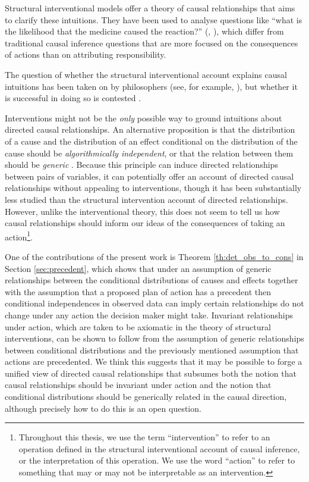 Structural interventional models offer a theory of causal relationships that aims to clarify these intuitions. They have been used to analyse questions like ``what is the likelihood that the medicine caused the reaction?'' (\citet[ch. ~9]{pearl_causality:_2009}, \citet{pearl_causes_2015}), which differ from traditional causal inference questions that are more focused on the consequences of actions than on attributing responsibility. 

The question of whether the structural interventional account explains causal intuitions has been taken on by philosophers (see, for example, \citet{woodward_causation_2016}), but whether it is successful in doing so is contested \citep{cartwright_modularity_2001}.

Interventions might not be the \emph{only} possible way to ground intuitions about directed causal relationships. An alternative proposition is that the distribution of a cause and the distribution of an effect conditional on the distribution of the cause should be \emph{algorithmically independent}, or that the relation between them should be \emph{generic} \citep{lemeire_replacing_2013}. Because this principle can induce directed relationships between pairs of variables, it can potentially offer an account of directed causal relationships without appealing to interventions, though it has been substantially less studied than the structural intervention account of directed relationships. However, unlike the interventional theory, this does not seem to tell us how causal relationships should inform our ideas of the consequences of taking an action\footnote{Throughout this thesis, we use the term ``intervention'' to refer to an operation defined in the structural interventional account of causal inference, or the interpretation of this operation. We use the word ``action'' to refer to something that may or may not be interpretable as an intervention.}.

One of the contributions of the present work is Theorem \ref{th:det_obs_to_cons} in Section \ref{sec:precedent}, which shows that under an assumption of generic relationships between the conditional distributions of causes and effects together with the assumption that a proposed plan of action has a precedent then conditional independences in observed data can imply certain relationships do not change under any action the decision maker might take. Invariant relationships under action, which are taken to be axiomatic in the theory of structural interventions, can be shown to follow from the assumption of generic relationships between conditional distributions and the previously mentioned assumption that actions are precedented. We think this suggests that it may be possible to forge a unified view of directed causal relationships that subsumes both the notion that causal relationships should be invariant under action and the notion that conditional distributions should be generically related in the causal direction, although precisely how to do this is an open question.

